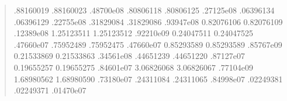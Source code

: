 \documentclass[letterpaper,10pt,english]{sphinxmanual}
\begin{document}
\begin{enumerate}
\begin{quote}
\begin{sphinxVerbatim}[commandchars=\\\{\}]
     .88160019           .88160023  .48700e\PYGZhy{}08 
     .80806118           .80806125  .27125e\PYGZhy{}08 
     .06396134           .06396129  .22755e\PYGZhy{}08 
     .31829084           .31829086  .93947e\PYGZhy{}08 
    \PYGZhy{}0.82076106          \PYGZhy{}0.82076109  .12389e\PYGZhy{}08 
    \PYGZhy{}1.25123511          \PYGZhy{}1.25123512  .92210e\PYGZhy{}09 
    \PYGZhy{}0.24047511          \PYGZhy{}0.24047525  .47660e\PYGZhy{}07 
     .75952489           .75952475  .47660e\PYGZhy{}07 
    \PYGZhy{}0.85293589          \PYGZhy{}0.85293589  .85767e\PYGZhy{}09 
    \PYGZhy{}0.21533869          \PYGZhy{}0.21533863  .34561e\PYGZhy{}08 
     .44651239           .44651220  .87127e\PYGZhy{}07 
    \PYGZhy{}0.19655257          \PYGZhy{}0.19655275  .84601e\PYGZhy{}07 
    \PYGZhy{}3.06826068          \PYGZhy{}3.06826067  .77104e\PYGZhy{}09 
    \PYGZhy{}1.68980562          \PYGZhy{}1.68980590  .73180e\PYGZhy{}07 
     .24311084           .24311065  .84998e\PYGZhy{}07 
     .02249381           .02249371  .01470e\PYGZhy{}07 

\end{sphinxVerbatim}
\end{quote}
\end{enumerate}
\end{document}
